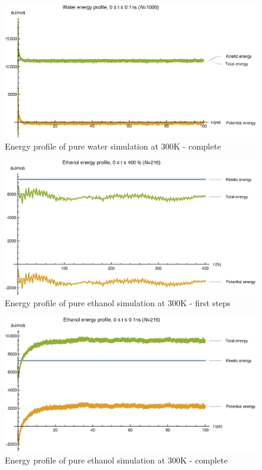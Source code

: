 \documentclass[11pt,a4paper]{article}
\begin{document}
\begin{figure}
\centering
\includegraphics[scale=0.8]{figures/ewater2}
\caption{Energy profile of pure water simulation at 300K - complete}\label{fig:ewater2}
\end{figure}

\begin{figure}
\centering
\includegraphics[scale=0.8]{figures/eethanol1}
\caption{Energy profile of pure ethanol simulation at 300K - first steps}\label{fig:eethanol1}
\end{figure}


\begin{figure}
\centering
\includegraphics[scale=0.8]{figures/eethanol2}
\caption{Energy profile of pure ethanol simulation at 300K - complete}\label{fig:eethanol2}
\end{figure}
\end{document}
